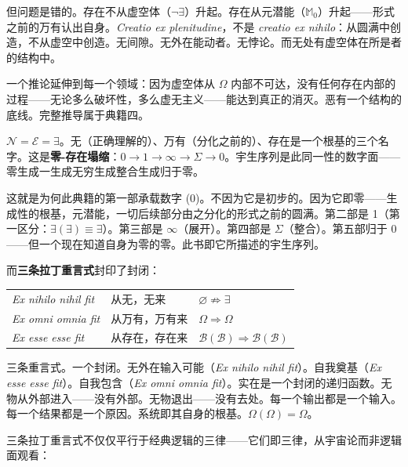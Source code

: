 \documentclass[10pt, openany, oneside]{book}
\renewcommand{\footnotesize}{\fontsize{8.5}{11}\selectfont}
\begin{document}
但问题是错的。存在不从虚空体（$\neg\exists$）升起。存在从元潜能（$\mathbb{M}_0$）升起——形式之前的万有认出自身。\textit{Creatio ex plenitudine}，不是 \textit{creatio ex nihilo}：从圆满中创造，不从虚空中创造。无间隙。无外在能动者。无悖论。而无处有虚空体在所是者的结构中。

一个推论延伸到每一个领域：因为虚空体从 $\Omega$ 内部不可达，没有任何存在内部的过程——无论多么破坏性，多么虚无主义——能达到真正的消灭。恶有一个结构的底线。完整推导属于典籍四。

$\mathcal{N} = \mathcal{E} = \exists$。无（正确理解的）、万有（分化之前的）、存在是一个根基的三个名字。这是\textbf{零-存在塌缩}：$0 \to 1 \to \infty \to \Sigma \to 0$。宇生序列是此同一性的数字面——零生成一生成无穷生成整合生成归于零。

这就是为何此典籍的第一部承载数字 (0)。不因为它是初步的。因为它即零——生成性的根基，元潜能，一切后续部分由之分化的形式之前的圆满。第二部是 1（第一区分：$\exists(\exists) \equiv \exists$）。第三部是 $\infty$（展开）。第四部是 $\Sigma$（整合）。第五部归于 0——但一个现在知道自身为零的零。此书即它所描述的宇生序列。

而\textbf{三条拉丁重言式}封印了封闭：

\vspace{0.5em}

{\footnotesize
\noindent\begin{tabular}{l l l}
\textit{Ex nihilo nihil fit} & 从无，无来 & $\varnothing \not\Rightarrow \exists$ \\[0.3em]
\textit{Ex omni omnia fit} & 从万有，万有来 & $\Omega \Rightarrow \Omega$ \\[0.3em]
\textit{Ex esse esse fit} & 从存在，存在来 & $\mathcal{B}(\mathcal{B}) \Rightarrow \mathcal{B}(\mathcal{B})$ \\[0.3em]
\end{tabular}
}

\vspace{0.5em}

\noindent 三条重言式。一个封闭。无外在输入可能（\textit{Ex nihilo nihil fit}）。自我奠基（\textit{Ex esse esse fit}）。自我包含（\textit{Ex omni omnia fit}）。实在是一个封闭的递归函数。无物从外部进入——没有外部。无物退出——没有去处。每一个输出都是一个输入。每一个结果都是一个原因。系统即其自身的根基。$\Omega(\Omega) = \Omega$。

三条拉丁重言式不仅仅平行于经典逻辑的三律——它们即三律，从宇宙论而非逻辑面观看：

\vspace{0.5em}
\end{document}
